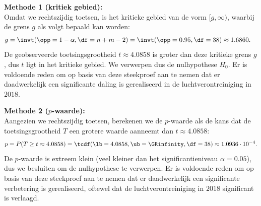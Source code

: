 {    {\noindent\bfseries Methode 1 (kritiek gebied):}\\
    Omdat we rechtszijdig toetsen, is het kritieke gebied van de vorm $[g, \infty)$, waarbij de grens $g$ als volgt bepaald kan worden:
    \begin{align*}
        g &= \invt(\opp=1-\alpha, \df = n + m - 2) = \invt(\opp=0.95, \df = 38) \approx 1.6860.
    \end{align*}
    De geobserveerde toetsingsgrootheid $t \approx 4.0858$ is groter dan deze kritieke grens $g$, dus $t$ ligt in het kritieke gebied.
    We verwerpen dus de nulhypothese $H_0$.
    Er is voldoende reden om op basis van deze steekproef aan te nemen dat er daadwerkelijk een significante daling is gerealiseerd in de luchtverontreiniging in $2018$.

    {\noindent\bfseries Methode 2 ($p$-waarde):}\\
    Aangezien we rechtszijdig toetsen, berekenen we de $p$-waarde als de kans dat de toetsingsgrootheid $T$ een grotere waarde aanneemt dan $t \approx 4.0858$:
    \begin{align*}
        p = P(T \geq t \approx 4.0858) = \tcdf(\lb=4.0858, \ub=\GRinfinity, \df=38) \approx 1.0936 \cdot 10^{-4}.
    \end{align*}
    De $p$-waarde is extreem klein (veel kleiner dan het significantieniveau $\alpha=0.05$), dus we besluiten om de nulhypothese te verwerpen.
    Er is voldoende reden om op basis van deze steekproef aan te nemen dat er daadwerkelijk een significante verbetering is gerealiseerd, oftewel
    dat de luchtverontreiniging in $2018$ significant is verlaagd.
}